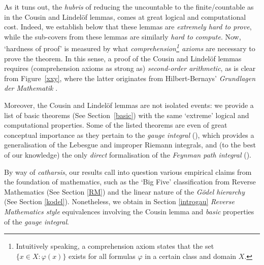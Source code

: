\documentclass[reqno]{amsart}
\newcommand{\Z}{{\textsf{\textup{Z}}}}
\numberwithin{equation}{section}
\numberwithin{thm}{section}
\begin{document}
\smallskip

As it tuns out, the \emph{hubris} of reducing the uncountable to the finite/countable as in the Cousin and Lindel\"of lemmas, comes at great logical and computational cost.  
Indeed, we establish below that these lemmas are \emph{extremely hard to prove}, while the sub-covers from these lemmas are similarly \emph{hard to compute}. 
Now, `hardness of proof' is measured by what \emph{comprehension\footnote{Intuitively speaking, a comprehension axiom states that the set $\{x\in X: \varphi(x)\}$ exists for all formulas $\varphi$ in a certain class and domain $X$.} axioms} are necessary to prove the theorem.  
In this sense, a proof of the Cousin and Lindel\"of lemmas requires (comprehension axioms as strong as) \emph{second-order arithmetic}, as is clear from Figure~\ref{xxy}, where
the latter originates from Hilbert-Bernays' \emph{Grundlagen der Mathematik} \cite{hillebilly2}.

\smallskip

Moreover, the Cousin and Lindel\"of lemmas are not isolated events: we provide a list of basic theorems (See Section~\ref{basic}) with the same `extreme' logical and computational properties.
Some of the listed theorems are even of great conceptual importance as they pertain to the \emph{gauge integral} (\cite{bartle}), which provides a generalisation of the Lebesgue and improper Riemann integrals, and (to the best of our knowledge) the only \emph{direct} formalisation of the \emph{Feynman path integral} (\cites{burkdegardener,mullingitover, mully}).     
%
%

\smallskip

%
By way of \emph{catharsis}, our results call into question various empirical claims from the foundation of mathematics, such as the `Big Five' classification from Reverse Mathematics (See Section \ref{RM}) and the linear nature of the \emph{G\"odel hierarchy} (See Section \ref{kodel}).  
Nonetheless, we obtain in Section \ref{introgau} \emph{Reverse Mathematics style} equivalences
involving the Cousin lemma and \emph{basic} properties of the \emph{gauge integral}.  %
\end{document}
